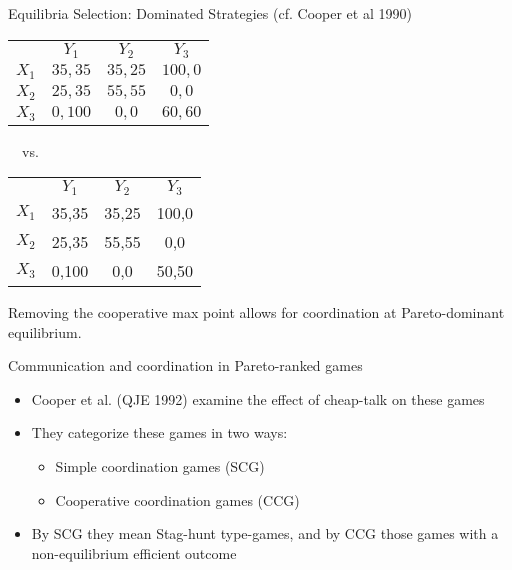 \documentclass{beamer}
\begin{document}
\begin{frame}{Equilibria Selection: Dominated Strategies (cf. Cooper et al 1990)}
	\begin{center}
		\begin{tabular}{r|c|c|c|}
			\multicolumn{1}{r}{ }& \multicolumn{1}{c}{$Y_1$}  & \multicolumn{1}{c}{$Y_2$} & \multicolumn{1}{c}{$Y_3$} \\ \cline{2-4}
			$X_1$ &  $35,35$  & $35,25$  & $100,0$ \\ \cline{2-4}
			$X_2$ &  $25,35$  & $55,55$  & $0,0$   \\ \cline{2-4}
			$X_3$ &  $0,100$  & $0,0$    & $60,60$  \\ \cline{2-4}
		\end{tabular}\ \ vs.\
		\begin{tabular}{r|c|c|c|}
			\multicolumn{1}{r}{ }& \multicolumn{1}{c}{$Y_1$}  & \multicolumn{1}{c}{$Y_2$} & \multicolumn{1}{c}{$Y_3$} \\ \cline{2-4}
			$X_1$ &  35,35 & 35,25  & 100,0 \\ \cline{2-4}
			$X_2$ &  25,35 & 55,55  & 0,0 \\ \cline{2-4}
			$X_3$ &  0,100 & 0,0  & 50,50  \\ \cline{2-4}
		\end{tabular}
	\end{center}

  Removing the cooperative max point allows for coordination at Pareto-dominant equilibrium.
\end{frame}

\begin{frame}{Communication and coordination in Pareto-ranked games}
	\begin{itemize}
		\item Cooper et al. (QJE 1992) examine the effect of cheap-talk on these games
		\item They categorize these games in two ways:
			\begin{itemize}
				\item Simple coordination games (SCG)
				\item Cooperative coordination games (CCG)
			\end{itemize}
		\item By SCG they mean Stag-hunt type-games, and by CCG those games with a non-equilibrium efficient outcome
	\end{itemize}
\end{frame}
\end{document}
